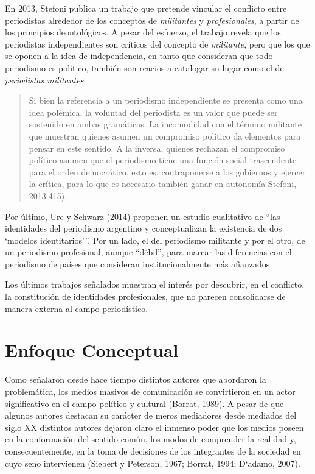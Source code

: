 En 2013, Stefoni publica un trabajo que pretende vincular el conflicto entre periodistas alrededor de los conceptos de \emph{militantes} y \emph{profesionales}, a partir de los principios deontológicos. A pesar del esfuerzo, el trabajo revela que los periodistas independientes son críticos del concepto de \emph{militante}, pero que los que se oponen a la idea de independencia, en tanto que consideran que todo periodismo es político, también son reacios a catalogar su lugar como el de \emph{periodistas militantes}.

\begin{quote}
Si bien la referencia a un periodismo independiente se presenta como una idea polémica, la voluntad del periodista es un valor que puede ser sostenido en ambas gramáticas. La incomodidad con el término militante que muestran quienes asumen un compromiso político da elementos para pensar en este sentido. A la inversa, quienes rechazan el compromiso político asumen que el periodismo tiene una función social trascendente para el orden democrático, esto es, contraponerse a los gobiernos y ejercer la crítica, para lo que es necesario también ganar en autonomía \parencite{@STEFONI2013CONTROVERSIAS} Stefoni, 2013:415).
\end{quote}

Por último, \textcite{@URE2014IDENTIDADES} Ure y Schwarz (2014) proponen un estudio cualitativo de \enquote{las identidades del periodismo argentino y conceptualizan la existencia de dos \enquote{modelos identitarios}}. Por un lado, el del periodismo militante y por el otro, de un periodismo profesional, aunque \enquote{débil}, para marcar las diferencias con el periodismo de países que consideran institucionalmente más afianzados.

Los últimos trabajos señalados muestran el interés por descubrir, en el conflicto, la constitución de identidades profesionales, que no parecen consolidarse de manera externa al campo periodístico.

\section{Enfoque Conceptual}

Como señalaron desde hace tiempo distintos autores que abordaron la problemática, los medios masivos de comunicación se convirtieron en un actor significativo en el campo político y cultural (Borrat, 1989). A pesar de que algunos autores destacan su carácter de meros mediadores  desde mediados del siglo XX distintos autores dejaron claro el inmenso poder que los medios poseen en la conformación del sentido común, los modos de comprender la realidad y, consecuentemente, en la toma de decisiones de los integrantes de la sociedad en cuyo seno intervienen (Siebert y Peterson, 1967; Borrat, 1994; D`adamo, 2007).

